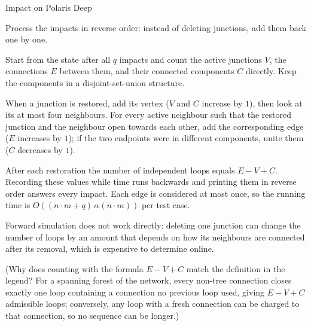 \begin{tutorial}{Impact on Polaris Deep}

Process the impacts in reverse order: instead of deleting junctions, add them back one by one.

Start from the state after all $q$ impacts and count the active junctions $V$, the connections $E$ between them, and their connected components $C$ directly. Keep the components in a disjoint-set-union structure.

When a junction is restored, add its vertex ($V$ and $C$ increase by $1$), then look at its at most four neighbours. For every active neighbour such that the restored junction and the neighbour open towards each other, add the corresponding edge ($E$ increases by $1$); if the two endpoints were in different components, unite them ($C$ decreases by $1$).

After each restoration the number of independent loops equals $E - V + C$. Recording these values while time runs backwards and printing them in reverse order answers every impact. Each edge is considered at most once, so the running time is $O((n \cdot m + q)\, \alpha(n \cdot m))$ per test case.

Forward simulation does not work directly: deleting one junction can change the number of loops by an amount that depends on how its neighbours are connected after its removal, which is expensive to determine online.

(Why does counting with the formula $E - V + C$ match the definition in the legend? For a spanning forest of the network, every non-tree connection closes exactly one loop containing a connection no previous loop used, giving $E - V + C$ admissible loops; conversely, any loop with a fresh connection can be charged to that connection, so no sequence can be longer.)


\end{tutorial}
